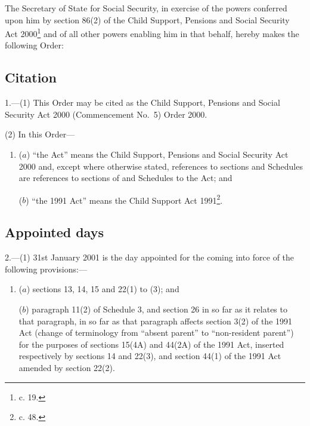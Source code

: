 \documentclass[12pt,a4paper]{article}
\title{\regstitle}
\author{S.I. 2000 No. 3354 (C.112)}
\date{Made 18th December 2000%
}
\begin{document}
\maketitle

\noindent
The Secretary of State for Social Security, in exercise of the powers conferred upon him by section 86(2) of the Child Support, Pensions and Social Security Act 2000\footnote{ c. 19.} and of all other powers enabling him in that behalf, hereby makes the following Order: 

{\sloppy

\tableofcontents

}

\bigskip

\setcounter{secnumdepth}{-2}

\subsection[1. Citation]{Citation}

1.---(1)  This Order may be cited as the Child Support, Pensions and Social Security Act 2000 (Commencement No.\ 5) Order 2000.

(2) In this Order—
\begin{enumerate}\item[]
($a$) “the Act” means the Child Support, Pensions and Social Security Act 2000 and, except where otherwise stated, references to sections and Schedules are references to sections of and Schedules to the Act; and

($b$) “the 1991 Act” means the Child Support Act 1991\footnote{ c. 48.}.
\end{enumerate}

\subsection[2. Appointed days]{Appointed days}

2.---(1)  31st January 2001 is the day appointed for the coming into force of the following provisions:—
\begin{enumerate}\item[]
($a$) sections 13, 14, 15 and 22(1) to (3); and

($b$) paragraph 11(2) of Schedule 3, and section 26 in so far as it relates to that paragraph, in so far as that paragraph affects section 3(2) of the 1991 Act (change of terminology from “absent parent” to “non-resident parent”) for the purposes of sections 15(4A) and 44(2A) of the 1991 Act, inserted respectively by sections 14 and 22(3), and section 44(1) of the 1991 Act amended by section 22(2).
\end{enumerate}
\end{document}
